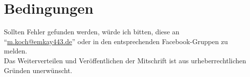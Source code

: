 \section{Bedingungen}\label{0.4}
Sollten Fehler gefunden werden, würde ich bitten, diese an ``\href{mailto:m.koch@emkay443.de}{m.koch@emkay443.de}'' oder in den entsprechenden Facebook-Gruppen zu melden.\\
Das Weiterverteilen und Veröffentlichen der Mitschrift ist aus urheberrechtlichen Gründen unerwünscht.